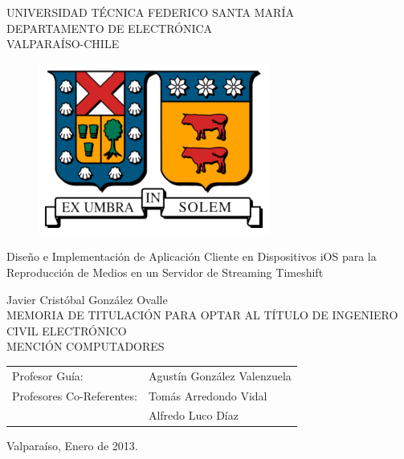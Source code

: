 \begin{titlepage}

\begin{center}

	\large  UNIVERSIDAD TÉCNICA FEDERICO SANTA MARÍA 	\\
 	\large \sc DEPARTAMENTO DE ELECTRÓNICA						\\
 	\large \sc VALPARAÍSO-CHILE												\\
\begin{figure}[h!]
	\centering
 	\includegraphics[scale=1]{imgs/logo_utfsm.eps} 
\end{figure}
\end{center}

\begin{center}
 \LARGE{Diseño e Implementación de Aplicación Cliente en Dispositivos iOS para la Reproducción de Medios en un Servidor de Streaming Timeshift}
\end{center}

\begin{center}
 \normalsize Javier Cristóbal González Ovalle\\
 \normalsize MEMORIA DE TITULACIÓN PARA OPTAR AL TÍTULO DE
 \normalsize INGENIERO CIVIL ELECTRÓNICO			\\
 \normalsize MENCIÓN COMPUTADORES
\end{center}
\vspace*{1.5cm}

\begin{center}
\begin{tabular}{ll}
 \normalsize Profesor Guía: & Agustín González Valenzuela\\
 \normalsize Profesores Co-Referentes: &Tomás Arredondo Vidal\\
 															&Alfredo Luco Díaz
\end{tabular}
\end{center}
 
\vspace*{2cm}
\begin{center}
 \normalsize Valparaíso, Enero de 2013. \\
\end{center}
\end{titlepage}